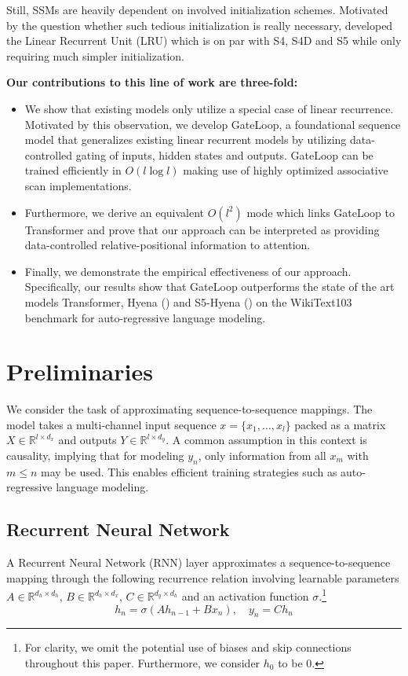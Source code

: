 \documentclass{article} \usepackage{iclr2024_conference,times}
\begin{document}
Still, SSMs are heavily dependent on involved initialization schemes. Motivated by the question whether such tedious initialization is really necessary, \cite{orvieto2023resurrecting} developed the Linear Recurrent Unit (LRU) which is on par with S4, S4D and S5 while only requiring much simpler initialization. 

\textbf{Our contributions to this line of work are three-fold:}
\vspace{0.2cm}
\begin{itemize}[noitemsep, itemsep=0.2cm, topsep=0pt]
  \item We show that existing models only utilize a special case of linear recurrence. Motivated by this observation, we develop GateLoop, a foundational sequence model that generalizes existing linear recurrent models by utilizing data-controlled gating of inputs, hidden states and outputs. GateLoop can be trained efficiently in $O(l \log l)$ making use of highly optimized associative scan implementations. 
  \item Furthermore, we derive an equivalent $O(l^2)$ mode which links GateLoop to Transformer and prove that our approach can be interpreted as providing data-controlled relative-positional information to attention. 
  \item Finally, we demonstrate the empirical effectiveness of our approach. Specifically, our results show that GateLoop outperforms the state of the art models Transformer, Hyena (\cite{poli2023hyena}) and S5-Hyena (\cite{smith2023github}) on the WikiText103 benchmark for auto-regressive language modeling.
\end{itemize}

\section{Preliminaries}
We consider the task of approximating sequence-to-sequence mappings. The model takes a multi-channel input sequence \( x = \{ x_1, \ldots, x_l \} \) packed as a matrix \( X \in \mathbb{R}^{l \times d_{x}} \) and outputs \( Y \in \mathbb{R}^{l \times d_{y}} \). A common assumption in this context is causality, implying that for modeling \( y_n \), only information from all \( x_m \) with \( m \leq n \) may be used. This enables efficient training strategies such as auto-regressive language modeling. 

\newpage

\subsection{Recurrent Neural Network}
A Recurrent Neural Network (RNN) layer approximates a sequence-to-sequence mapping through the following recurrence relation involving learnable parameters $A \in \mathbb{R}^{d_h \times d_h}$, $B \in \mathbb{R}^{d_h \times d_x}$, $C \in \mathbb{R}^{d_y \times d_h}$ and an activation function $\sigma$.\footnote{For clarity, we omit the potential use of biases and skip connections throughout this paper. Furthermore, we consider $h_0$ to be 0.} 
\begin{equation}\label{eq:rnn}
h_n = \sigma(A h_{n-1} + B x_n), \quad y_n = C h_n
\end{equation}
\end{document}
